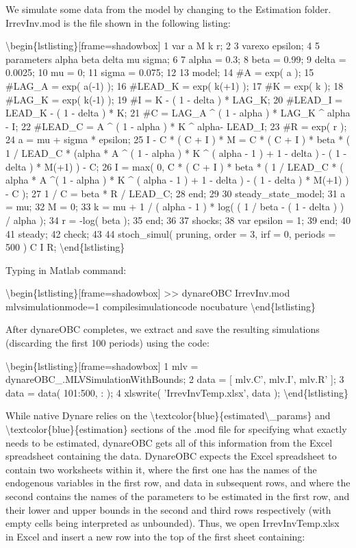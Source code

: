 \documentclass[10pt,math=newtx,citestyle=gb7714-2015,bibstyle=gb7714-2015]{elegantbook}
\begin{document}
	We simulate some data from the model by changing to the Estimation folder. IrrevInv.mod is the file shown in the following listing:
	
	\textbackslash{}begin\{lstlisting\}[frame=shadowbox]
	1 var a M k r;
	2 
	3 varexo epsilon;
	4 
	5 parameters alpha beta delta mu sigma;
	6
	7 alpha = 0.3;
	8 beta = 0.99;
	9 delta = 0.0025;
	10 mu = 0;
	11 sigma = 0.075;
	12
	13 model;
	14 \#A = exp( a );
	15 \#LAG\_A = exp( a(-1) );
	16 \#LEAD\_K = exp( k(+1) );
	17 \#K = exp( k );
	18 \#LAG\_K = exp( k(-1) );
	19 \#I = K - ( 1 - delta ) * LAG\_K;
	20 \#LEAD\_I = LEAD\_K - ( 1 - delta ) * K;
	21 \#C = LAG\_A \^{} ( 1 - alpha ) * LAG\_K \^{} alpha - I;
	22 \#LEAD\_C = A \^{} ( 1 - alpha ) * K \^{} alpha- LEAD\_I;
	23 \#R = exp( r );
	24 a = mu + sigma * epsilon;
	25 I - C * ( C + I ) * M = C * ( C + I ) * beta * ( 1 / LEAD\_C * 
	(alpha * A \^{} ( 1 - alpha ) * K \^{} ( alpha - 1 ) + 1 - delta
	) - ( 1 - delta ) * M(+1) ) - C;
	26 I = max( 0, C * ( C + I ) * beta * ( 1 / LEAD\_C * ( alpha *
	A \^{}( 1 - alpha ) * K \^{} ( alpha - 1 ) + 1 - delta ) - ( 1 -
	delta ) * M(+1) ) - C );
	27 1 / C = beta * R / LEAD\_C;
	28 end;
	29
	30 steady\_state\_model;
	31 a = mu;
	32 M = 0;
	33 k = mu + 1 / ( alpha - 1 ) * log( ( 1 / beta - ( 1 - delta ) )
	/ alpha );
	34 r = -log( beta );
	35 end;
	36
	37 shocks;
	38 var epsilon = 1;
	39 end;
	40
	41 steady;
	42 check;
	43
	44 stoch\_simul( pruning, order = 3, irf = 0, periods = 500 ) C I R;
	\textbackslash{}end\{lstlisting\}
	
	Typing in Matlab command:
	
	\textbackslash{}begin\{lstlisting\}[frame=shadowbox]
	>> dynareOBC IrrevInv.mod mlvsimulationmode=1
	compilesimulationcode nocubature
	\textbackslash{}end\{lstlisting\}
	
	After dynareOBC completes, we extract and save the resulting simulations (discarding the first 100 periods) using the code:
	
	\textbackslash{}begin\{lstlisting\}[frame=shadowbox]
	1 mlv = dynareOBC\_.MLVSimulationWithBounds;
	2 data = [ mlv.C', mlv.I', mlv.R' ];
	3 data = data( 101:500, : );
	4 xlswrite( 'IrrevInvTemp.xlsx', data );
	\textbackslash{}end\{lstlisting\}
	
	While native Dynare relies on the \textbackslash{}textcolor\{blue\}\{estimated\textbackslash{}\_params\} and \textbackslash{}textcolor\{blue\}\{estimation\} sections of the .mod file for specifying what exactly needs to be estimated, dynareOBC gets all of this information from the Excel spreadsheet containing the data. DynareOBC expects the Excel spreadsheet to contain two worksheets within it, where the first one has the names of the endogenous variables in the first row, and data in subsequent rows, and where the second contains the names of the
	parameters to be estimated in the first row, and their lower and upper bounds in the second and third rows respectively (with empty cells being interpreted as unbounded). Thus, we open IrrevInvTemp.xlsx in Excel and insert a new row into the top of the first sheet containing:
	
\end{document}
